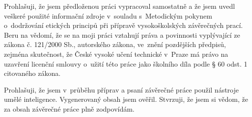 \documentclass[czech,master,unicode,twoside]{ctufit-thesis}
\begin{document}
\begin{declarationpage}
Prohlašuji, že jsem předloženou práci vypracoval samostatně a že jsem uvedl veškeré
použité informační zdroje v~souladu s~Metodickým pokynem o~dodržování etických
principů při přípravě vysokoškolských závěrečných prací.
Beru na vědomí, že se na moji práci vztahují práva a povinnosti vyplývající ze zákona
č. 121/2000 Sb., autorského zákona, ve~znění pozdějších předpisů, zejména
skutečnost, že České vysoké učení technické v~Praze má právo na uzavření licenční
smlouvy o~užití této práce jako školního díla podle § 60 odst. 1 citovaného zákona.

\vspace{1em}


Prohlašuji, že jsem v~průběhu příprav a psaní závěrečné práce použil nástroje umělé
inteligence. Vygenerovaný obsah jsem ověřil. 
Stvrzuji, že jsem si vědom, že za obsah závěrečné práce plně zodpovídám.
\end{declarationpage}

\printabstractpage %

\tableofcontents %
\listoffigures %
\begingroup
\let\clearpage\relax
\listoftables %
\thectufitlistingscommand
\endgroup

\chapter{\thectufitabbreviationlabel}
 
\end{document}
